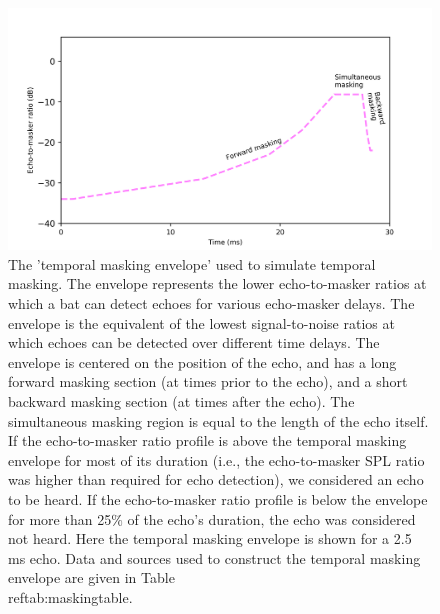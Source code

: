 \documentclass[
]{book}
\begin{document}
\begin{figure}
\includegraphics[]{original_papers/CPN_figures/Figures_SI/Figure_S1.png}
\centering
\caption{ The 'temporal masking envelope' used to simulate temporal masking. The envelope represents the lower echo-to-masker ratios at which a bat can detect echoes for various echo-masker delays. The envelope is the equivalent of the lowest signal-to-noise ratios at which echoes can be detected over different time delays. The envelope is centered on the position of the echo, and has a long forward masking section (at times prior to the echo), and a short backward masking section (at times after the echo). The simultaneous masking region is equal to the length of the echo itself. If the echo-to-masker ratio profile is above the temporal masking envelope for most of its duration (i.e., the echo-to-masker SPL ratio was higher than required for echo detection), we considered an echo to be heard. If the echo-to-masker ratio profile is below the envelope for more than 25$\%$ of the echo's duration, the echo was considered not heard. Here the temporal masking envelope is shown for a 2.5 ms echo. Data and sources used to construct the temporal masking envelope are given in Table \\ref{tab:maskingtable}.}
\label{cpn_figS1}
\end{figure}

\newpage
\end{document}
